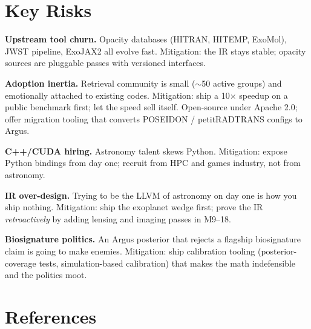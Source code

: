 \documentclass[11pt,a4paper]{article}
\begin{document}
\section{Key Risks}

\begin{warnbox}
\textbf{Upstream tool churn.} Opacity databases (HITRAN, HITEMP, ExoMol), JWST pipeline, ExoJAX2 all evolve fast. Mitigation: the IR stays stable; opacity sources are pluggable passes with versioned interfaces.

\textbf{Adoption inertia.} Retrieval community is small ($\sim$50 active groups) and emotionally attached to existing codes. Mitigation: ship a 10$\times$ speedup on a public benchmark first; let the speed sell itself. Open-source under Apache 2.0; offer migration tooling that converts POSEIDON / petitRADTRANS configs to Argus.

\textbf{C++/CUDA hiring.} Astronomy talent skews Python. Mitigation: expose Python bindings from day one; recruit from HPC and games industry, not from astronomy.

\textbf{IR over-design.} Trying to be the LLVM of astronomy on day one is how you ship nothing. Mitigation: ship the exoplanet wedge first; prove the IR \emph{retroactively} by adding lensing and imaging passes in M9--18.

\textbf{Biosignature politics.} An Argus posterior that rejects a flagship biosignature claim is going to make enemies. Mitigation: ship calibration tooling (posterior-coverage tests, simulation-based calibration) that makes the math indefensible and the politics moot.
\end{warnbox}

\section{References}
\end{document}
